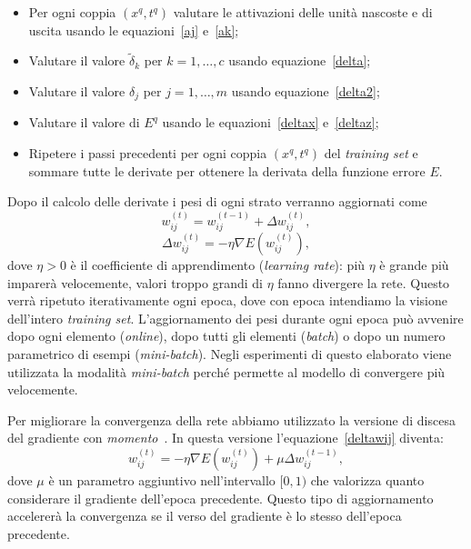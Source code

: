 \documentclass[11pt,a4paper,twoside,
openright]{book}
\begin{document}
\begin{itemize}
\item Per ogni coppia $(x^q,t^q)$ valutare le attivazioni delle unità nascoste e di uscita usando le equazioni~\eqref{aj} e~\eqref{ak};
\item Valutare il valore $\tilde{\delta}_k$ per $k=1,\dots,c$ usando equazione~\eqref{delta};
\item Valutare il valore $\delta_j$ per $j=1,\dots,m$ usando equazione~\eqref{delta2};
\item Valutare il valore di $E^q$ usando le equazioni~\eqref{deltax} e~\eqref{deltaz};
\item Ripetere i passi precedenti per ogni coppia $(x^q,t^q)$ del \textit{training set} e sommare tutte le derivate per ottenere la derivata della funzione errore $E$.
\end{itemize}

Dopo il calcolo delle derivate i pesi di ogni strato verranno aggiornati come
\begin{equation}
w_{ij}^{(t)}=w_{ij}^{(t-1)} + \Delta w_{ij}^{(t)},
\label{update_w_ij}
\end{equation}
\begin{equation}
\Delta w_{ij}^{(t)} = -\eta \nabla E(w_{ij}^{(t)}),
\label{deltawij}
\end{equation}
dove $\eta>0$ è il coefficiente di apprendimento (\textit{learning rate}): più $\eta$ è grande più imparerà velocemente, valori troppo grandi di $\eta$ fanno divergere la rete.
Questo verrà ripetuto iterativamente ogni epoca, dove con epoca intendiamo la visione dell'intero \textit{training set}.
L'aggiornamento dei pesi durante ogni epoca può avvenire dopo ogni elemento (\textit{online}), dopo tutti gli elementi (\textit{batch}) o dopo un numero parametrico di esempi (\textit{mini-batch}).
Negli esperimenti di questo elaborato viene utilizzata la modalità \textit{mini-batch} perché permette al modello di convergere più velocemente.

Per migliorare la convergenza della rete abbiamo utilizzato la versione di discesa del gradiente con \textit{momento}~\cite{journals/nn/Qian99}.
In questa versione l'equazione~\eqref{deltawij} diventa:
\begin{equation}
w_{ij}^{(t)}=- \eta \nabla E(w_{ij}^{(t)}) + \mu \Delta w_{ij}^{(t-1)},
\label{momentum}
\end{equation}
dove $\mu$ è un parametro aggiuntivo nell'intervallo $[0,1)$ che valorizza quanto considerare il gradiente dell'epoca precedente. 
Questo tipo di aggiornamento accelererà la convergenza se il verso del gradiente è lo stesso dell'epoca precedente. 
\end{document}
